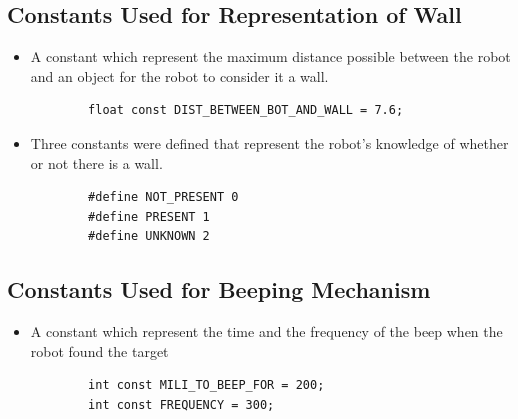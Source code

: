\documentclass[11pt]{article}
\begin{document}

\subsection{Constants Used for Representation of Wall}
\begin{itemize}
\item A constant which represent the maximum distance possible between the robot and an object for the robot to consider it a wall.
	\begin{verbatim}
		float const DIST_BETWEEN_BOT_AND_WALL = 7.6;
	\end{verbatim}
\item Three constants were defined that represent the robot's knowledge of whether or not there is a wall. 
	\begin{verbatim}
		#define NOT_PRESENT 0 
		#define PRESENT 1
		#define UNKNOWN 2
	\end{verbatim}
\end{itemize}


\subsection{Constants Used for Beeping Mechanism}
\begin{itemize}
\item A constant which represent the time and the frequency of the beep when the robot found the target
	\begin{verbatim}
		int const MILI_TO_BEEP_FOR = 200;
		int const FREQUENCY = 300;
	\end{verbatim}
\end{itemize}

\newpage

\end{document}
